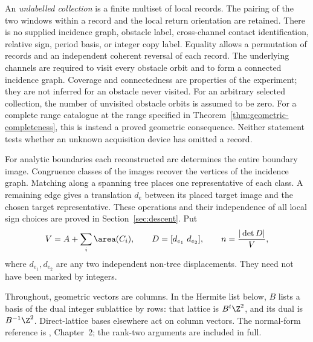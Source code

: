 An \emph{unlabelled collection} is a finite multiset of local records.
The pairing of the two windows within a record and the local return
orientation are retained. There is no supplied incidence graph, obstacle
label, cross-channel contact identification, relative sign, period basis,
or integer copy label. Equality allows a permutation of records and an
independent coherent reversal of each record. The underlying channels
are required to visit every obstacle orbit and to form a connected
incidence graph. Coverage and connectedness are properties of the
experiment; they are not inferred for an obstacle never visited.
For an arbitrary selected collection, the number of unvisited obstacle
orbits is assumed to be zero. For a complete range catalogue at the
range specified in Theorem~\ref{thm:geometric-completeness}, this is
instead a proved geometric consequence. Neither statement tests whether
an unknown acquisition device has omitted a record.

For analytic boundaries each reconstructed arc determines the entire
boundary image. Congruence classes of the images recover the vertices
of the incidence graph. Matching along a spanning tree places one
representative of each class. A remaining edge gives a translation
$d_e$ between its placed target image and the chosen target representative.
These operations and their independence of all local sign choices are
proved in Section~\ref{sec:descent}. Put
\begin{equation}\label{eq:calibrated-volume}
 V=A+\sum_i\area(C_i),\qquad
 D=[d_{e_1}\ d_{e_2}],\qquad n=\frac{|\det D|}{V},
\end{equation}
where $d_{e_1},d_{e_2}$ are any two independent non-tree displacements.
They need not have been marked by integers.

Throughout, geometric vectors are columns. In the Hermite list below,
$B$ lists a basis of the dual integer sublattice by rows: that lattice is
$B^t\Z^2$, and its dual is $B^{-1}\Z^2$. Direct-lattice bases elsewhere
act on column vectors. The normal-form reference is \cite{Cohen},
Chapter~2; the rank-two arguments are included in full.

